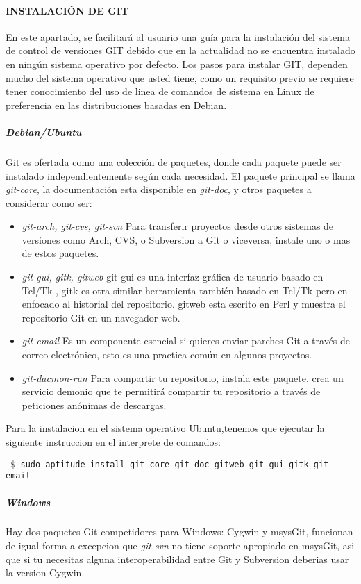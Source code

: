 \paragraph{INSTALACIÓN DE GIT}

En este apartado, se facilitará al usuario una guía para la instalación del sistema de control de versiones GIT debido que en la actualidad no se encuentra instalado en ningún sistema operativo por defecto. Los pasos para instalar GIT, dependen mucho del sistema operativo que usted tiene, como un requisito previo se requiere tener conocimiento del uso de linea de comandos de sistema en Linux de preferencia en las distribuciones basadas en Debian.
\subparagraph{Debian/Ubuntu}
Git es ofertada como una colección de paquetes, donde cada paquete puede ser instalado independientemente según cada necesidad. El paquete principal se llama \textit{git-core}, la documentación esta disponible en \textit{git-doc}, y otros paquetes a considerar como ser:

\begin{itemize}
 \item \textit{git-arch, git-cvs, git-svn}
Para transferir proyectos desde otros sistemas de versiones como Arch, CVS, o Subversion a Git o viceversa,
instale uno o mas de estos paquetes.

\item \textit{git-gui, gitk, gitweb}
git-gui es una interfaz gráfica de usuario basado en Tcl/Tk , gitk es otra similar herramienta también basado en Tcl/Tk pero en enfocado al historial del repositorio.
gitweb esta escrito en Perl y muestra el repositorio Git en un navegador web.

\item \textit{git-cmail}
Es un componente esencial si quieres enviar parches Git a través de correo electrónico, esto es una practica común en algunos proyectos.

\item \textit{git-dacmon-run}
Para compartir tu repositorio, instala este paquete. crea un servicio demonio que te permitirá compartir tu repositorio a través de peticiones anónimas de descargas.
\end{itemize}
Para la instalacion en el sistema operativo Ubuntu,tenemos que ejecutar la siguiente instruccion en el interprete de comandos:
\begin{verbatim}
 $ sudo aptitude install git-core git-doc gitweb git-gui gitk git-email
\end{verbatim}

\subparagraph{Windows}
Hay dos paquetes Git competidores para Windows: Cygwin y msysGit, funcionan de igual forma a excepcion que \textit{git-svn} no tiene soporte apropiado en msysGit,
asi que si tu necesitas alguna interoperabilidad entre Git y Subversion deberias usar la version Cygwin.

